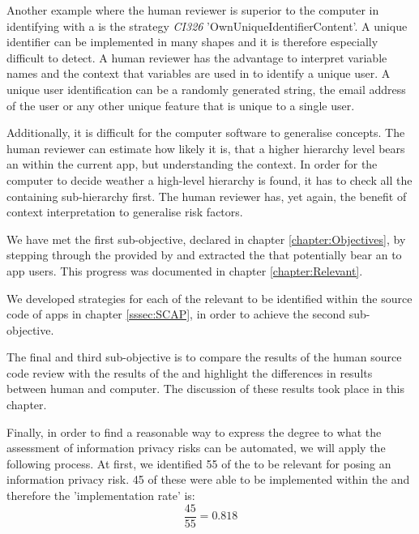 Another example where the human reviewer is superior to the computer in identifying \ipr with a \sca is the strategy \textit{CI326} 'OwnUniqueIdentifierContent'.
A unique identifier can be implemented in many shapes and it is therefore especially difficult to detect.
A human reviewer has the advantage to interpret variable names and the context that variables are used in to identify a unique user.
A unique user identification can be a randomly generated string, the email address of the user or any other unique feature that is unique to a single user.

Additionally, it is difficult for the computer software to generalise concepts.
The human reviewer can estimate how likely it is, that a higher hierarchy level \ipp bears an \ipr within the current app, but understanding the context.
In order for the computer to decide weather a high-level hierarchy is found, it has to check all the containing sub-hierarchy \ipp first.
The human reviewer has, yet again, the benefit of context interpretation to generalise risk factors.

We have met the first sub-objective, declared in chapter \ref{chapter:Objectives}, by stepping through the \ipp provided by \textcite{Dehling2016} and extracted the \ipp that potentially bear an \ipr to \mH app users.
This progress was documented in chapter \ref{chapter:Relevant}.

We developed strategies for each of the relevant \ipp to be identified within the source code of \mH apps in chapter \ref{sssec:SCAP}, in order to achieve the second sub-objective.

The final and third sub-objective is to compare the results of the human source code review with the results of the \aiprat and highlight the differences in results between human and computer.
The discussion of these results took place in this chapter.

Finally, in order to find a reasonable way to express the degree to what the assessment of information privacy risks can be automated, we will apply the following process.
At first, we identified 55 of the \ipp to be relevant for posing an information privacy risk. 
45 of these \ipp were able to be implemented within the \aiprat and therefore the 'implementation rate' is:
\begin{equation}
	\frac{45}{55}=0.818
\end{equation}

